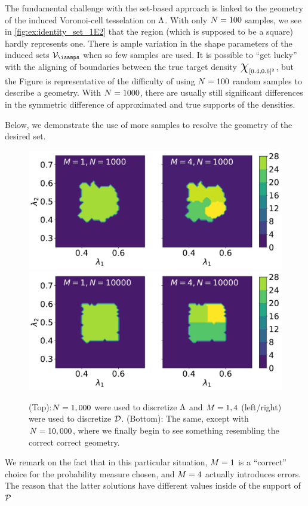 The fundamental challenge with the set-based approach is linked to the geometry of the induced Voronoi-cell tesselation on ${\Lambda}$.
With only $N = 100$ samples, we see in \ref{fig:ex:identity_set_1E2} that the region (which is supposed to be a square) hardly represents one.
There is ample variation in the shape parameters of the induced sets $\VV_\isamps$ when so few samples are used.
It is possible to ``get lucky'' with the aligning of boundaries between the true target density $\Chi_{[0.4, 0.6]^2}$, but the Figure is representative of the difficulty of using $N = 100$ random samples to describe a geometry.
With $N = 1000$, there are usually still significant differences in the symmetric difference of approximated and true supports of the densities.

Below, we demonstrate the use of more samples to resolve the geometry of the desired set.
\begin{figure}[ht]
\begin{minipage}{.975\textwidth}
  \includegraphics[width=\linewidth]{./examples/identity/set/M1-N1000_N1000-vs-M4-N1000_N1000.pdf}
  \includegraphics[width=\linewidth]{./examples/identity/set/M1-N10000_N10000-vs-M4-N10000_N10000.pdf}
\end{minipage}
\caption{
(Top):$N=1,000$ were used to discretize ${\Lambda}$ and $M=1, 4$ (left/right) were used to discretize $\mathcal{D}$.
(Bottom): The same, except with $N=10,000$, where we finally begin to see something resembling the correct correct geometry.
}
\label{fig:ex:identity_set_1E3_1E4}
\end{figure}
\FloatBarrier

We remark on the fact that in this particular situation, $M = 1$ is a ``correct'' choice for the probability measure chosen, and $M = 4$ actually introduces errors.
The reason that the latter solutions have different values inside of the support of $\mathcal{P}$
